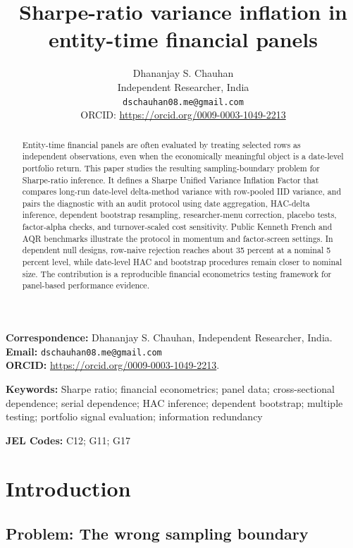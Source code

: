 \documentclass[12pt,a4paper]{article}
\title{Sharpe-ratio variance inflation in entity-time financial panels}
\author{}
\author{Dhananjay S. Chauhan\\
Independent Researcher, India\\
\texttt{dschauhan08.me@gmail.com}\\
ORCID: \url{https://orcid.org/0009-0003-1049-2213}}
\date{}
\newif\ifblinded
\begin{document}
\linenumbers
\maketitle

\ifblinded
\else
\noindent\textbf{Correspondence:} Dhananjay S. Chauhan, Independent
Researcher, India.\\
\textbf{Email:} \texttt{dschauhan08.me@gmail.com}\\
\textbf{ORCID:} \url{https://orcid.org/0009-0003-1049-2213}.
\fi

\begin{abstract}
Entity-time financial panels are often evaluated by treating selected
rows as independent observations, even when the economically meaningful
object is a date-level portfolio return. This paper studies the
resulting sampling-boundary problem for Sharpe-ratio inference. It
defines a Sharpe Unified Variance Inflation Factor that compares
long-run date-level delta-method variance with row-pooled IID variance,
and pairs the diagnostic with an audit protocol using date aggregation,
HAC-delta inference, dependent bootstrap resampling, researcher-menu
correction, placebo tests, factor-alpha checks, and turnover-scaled cost
sensitivity. Public Kenneth French and AQR benchmarks illustrate the
protocol in momentum and factor-screen settings. In dependent null
designs, row-naive rejection reaches about 35 percent at a nominal 5
percent level, while date-level HAC and bootstrap procedures remain
closer to nominal size. The contribution is a reproducible financial
econometrics testing framework for panel-based performance evidence.
\end{abstract}

\noindent\textbf{Keywords:} Sharpe ratio; financial econometrics; panel data; cross-sectional
dependence; serial dependence; HAC inference; dependent bootstrap; multiple
testing; portfolio signal evaluation; information redundancy

\noindent\textbf{JEL Codes:} C12; G11; G17

\section{Introduction}

\subsection{Problem: The wrong sampling boundary}
\end{document}

